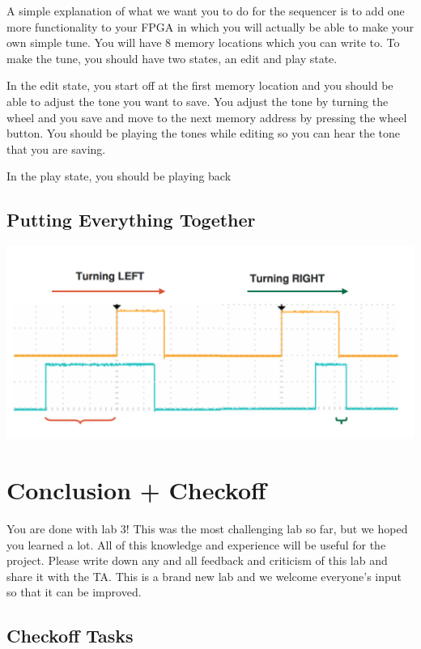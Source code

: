 \documentclass[11pt]{article}
\begin{document}
A simple explanation of what we want you to do for the sequencer is to add one more functionality to your FPGA in which you will actually be able to make your own simple tune. You will have 8 memory locations which you can write to. To make the tune, you should have two states, an edit and play state. 

In the edit state, you start off at the first memory location and you should be able to adjust the tone you want to save. You adjust the tone by turning the wheel and you save and move to the next memory address by pressing the wheel button. You should be playing the tones while editing so you can hear the tone that you are saving. 

In the play state, you should be playing back

\subsection{Putting Everything Together}  


\includegraphics[width=\textwidth]{images/lab2_fig6.png}

\section{Conclusion + Checkoff}
You are done with lab 3! This was the most challenging lab so far, but we hoped you learned a lot. All of this knowledge and experience will be useful for the project. Please write down any and all feedback and criticism of this lab and share it with the TA. This is a brand new lab and we welcome everyone's input so that it can be improved.\\

\subsection{Checkoff Tasks}
\end{document}
